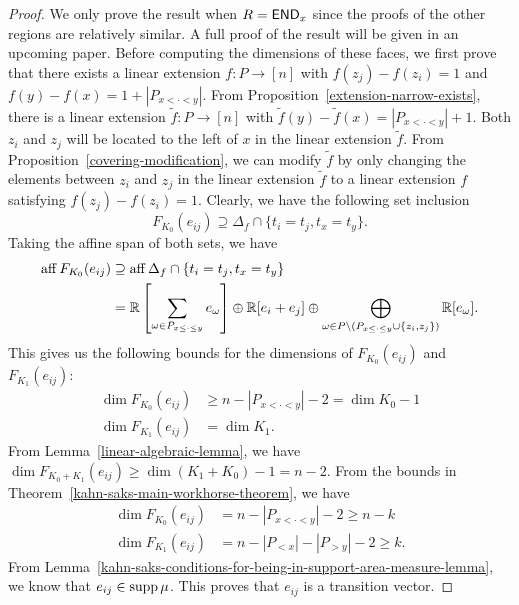 \documentclass{puthesis-UG}
\begin{document}
\begin{proof}
	 We only prove the result when $R = \mathsf{END}_x$ since the proofs of the other regions are relatively similar. A full proof of the result will be given in an upcoming paper. Before computing the dimensions of these faces, we first prove that there exists a linear extension $f : P \to [n]$ with $f(z_j) - f(z_i) = 1$ and $f(y) - f(x) = 1 + |P_{x < \cdot < y}|$. From Proposition~\ref{extension-narrow-exists}, there is a linear extension $\tilde{f} : P \to [n]$ with $\tilde{f}(y) - \tilde{f}(x) = |P_{x < \cdot < y}| + 1$. Both $z_i$ and $z_j$ will be located to the left of $x$ in the linear extension $\tilde{f}$. From Proposition~\ref{covering-modification}, we can modify $\tilde{f}$ by only changing the elements between $z_i$ and $z_j$ in the linear extension $\tilde{f}$ to a linear extension $f$ satisfying $f(z_j) - f(z_i) = 1$. Clearly, we have the following set inclusion
    \[
        F_{K_0}(e_{ij}) \supseteq \Delta_f \cap \{t_i = t_j, t_x = t_y\}.
    \]
    Taking the affine span of both sets, we have 
    \begin{align*}
        \operatorname{aff} F_{K_0}(e_{ij}) & \supseteq \operatorname{aff} \Delta_f \cap \{t_i = t_j, t_x = t_y\} \\
        & = \mathbb{R} \left [ \sum_{\omega \in P_{x \leq \cdot \leq y}} e_\omega \right ] \oplus \mathbb{R} [ e_i + e_j] \oplus \bigoplus_{\omega \in P \backslash (P_{x \leq \cdot \leq y} \cup \{z_i, z_j\})} \mathbb{R}[e_\omega]. 
    \end{align*}
    This gives us the following bounds for the dimensions of $F_{K_0}(e_{ij})$ and $F_{K_1}(e_{ij})$:
    \begin{align*}
        \dim F_{K_0}(e_{ij}) & \geq n - |P_{x < \cdot < y}| - 2 = \dim K_0 - 1\\
        \dim F_{K_1}(e_{ij}) & = \dim K_1. 
    \end{align*}
    From Lemma~\ref{linear-algebraic-lemma}, we have $\dim F_{K_0 + K_1}(e_{ij}) \geq \dim (K_1 + K_0) - 1 = n-2$. From the bounds in Theorem~\ref{kahn-saks-main-workhorse-theorem}, we have 
    \begin{align*}
        \dim F_{K_0}(e_{ij}) & = n - |P_{x < \cdot < y}| - 2 \geq n - k \\
        \dim F_{K_1}(e_{ij}) & = n - |P_{< x}| - |P_{> y}| - 2 \geq k. 
    \end{align*}
    From Lemma~\ref{kahn-saks-conditions-for-being-in-support-area-measure-lemma}, we know that $e_{ij} \in \operatorname{supp} \mu$. This proves that $e_{ij}$ is a transition vector.
\end{proof}
\end{document}

